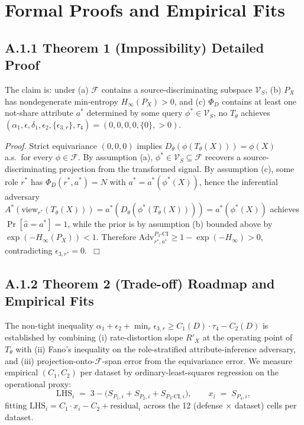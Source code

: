 \documentclass{article}
\theoremstyle{remark}
\begin{document}
\appendix

\section{Formal Proofs and Empirical Fits}
\label{app:proofs}

\subsection*{A.1.1 Theorem 1 (Impossibility) Detailed Proof}
The claim is: under (a) $\mathcal{F}$ contains a source-discriminating subspace $\mathcal{V}_S$, (b) $P_X$ has nondegenerate min-entropy $H_\infty(P_X) > 0$, and (c) $\Phi_D$ contains at least one not-share attribute $a^*$ determined by some query $\phi^* \in \mathcal{V}_S$, no $T_\theta$ achieves $(\alpha_1, \epsilon, \delta_1, \epsilon_2, \{\epsilon_{3,r}\}, \tau_4) = (0, 0, 0, 0, \{0\}, > 0)$.

\textit{Proof.} Strict equivariance $(0, 0, 0)$ implies $D_\theta(\phi(T_\theta(X))) = \phi(X)$ a.s.\ for every $\phi \in \mathcal{F}$. By assumption (a), $\phi^* \in \mathcal{V}_S \subseteq \mathcal{F}$ recovers a source-discriminating projection from the transformed signal. By assumption (c), some role $r^*$ has $\Phi_D(r^*, a^*) = N$ with $a^* = a^*(\phi^*(X))$, hence the inferential adversary $A^*(\mathrm{view}_{r^*}(T_\theta(X))) = a^*(D_\theta(\phi^*(T_\theta(X)))) = a^*(\phi^*(X))$ achieves $\Pr[\hat{a} = a^*] = 1$, while the prior is by assumption (b) bounded above by $\exp(-H_\infty(P_X)) < 1$. Therefore $\mathrm{Adv}^{P_3\text{-CI}}_{r^*, a^*} \ge 1 - \exp(-H_\infty) > 0$, contradicting $\epsilon_{3, r^*} = 0$.~$\Box$

\subsection*{A.1.2 Theorem 2 (Trade-off) Roadmap and Empirical Fits}

The non-tight inequality $\alpha_1 + \epsilon_2 + \min_r \epsilon_{3,r} \ge C_1(D) \cdot \tau_4 - C_2(D)$ is established by combining (i) rate-distortion slope $R'_X$ at the operating point of $T_\theta$ with (ii) Fano's inequality on the role-stratified attribute-inference adversary, and (iii) projection-onto-$\mathcal{F}$-span error from the equivariance error. We measure empirical $(C_1, C_2)$ per dataset by ordinary-least-squares regression on the operational proxy:
\[
\mathrm{LHS}_i \;=\; 3 - \bigl(S_{P_1, i} + S_{P_2, i} + S_{P_3\text{-CI}, i}\bigr), \qquad x_i \;=\; S_{P_4, i},
\]
fitting $\mathrm{LHS}_i = C_1 \cdot x_i - C_2 + \mathrm{residual}_i$ across the 12 (defense $\times$ dataset) cells per dataset.
\end{document}
